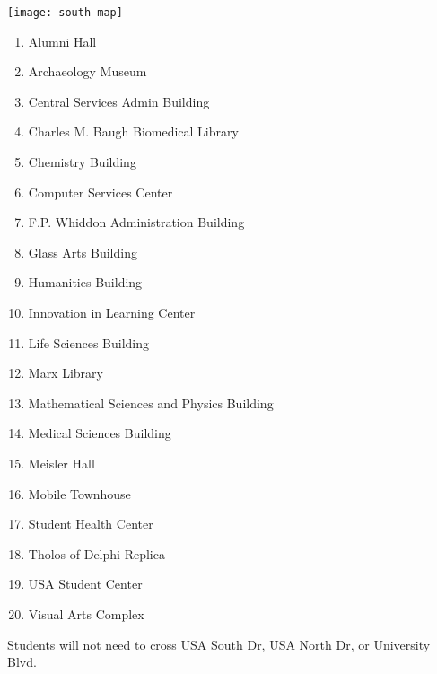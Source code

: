 \documentclass{../puzzlehunt}
\title{\phEventName}
\author{Mathematical Puzzle Programs}
\date{\today}
\begin{document}




\begin{center}
  \texttt{[image: south-map]}
\end{center}

\begin{multicols}{2}
  \begin{enumerate}
    \item Alumni Hall
    \item Archaeology Museum
    \item Central Services Admin Building
    \item Charles M. Baugh Biomedical Library
    \item Chemistry Building
    \item Computer Services Center
    \item F.P. Whiddon Administration Building
    \item Glass Arts Building
    \item Humanities Building
    \item Innovation in Learning Center
    \item Life Sciences Building
    \item Marx Library
    \item Mathematical Sciences and Physics Building
    \item Medical Sciences Building
    \item Meisler Hall
    \item Mobile Townhouse
    \item Student Health Center
    \item Tholos of Delphi Replica
    \item USA Student Center
    \item Visual Arts Complex
  \end{enumerate}
\end{multicols}

Students will not need to cross USA South Dr, USA North Dr, or University Blvd.
\end{document}
